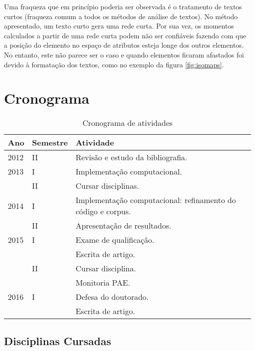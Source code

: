 \documentclass[a4paper,openright,12pt]{report} %
\begin{document}
Uma fraqueza que em princ\'ipio poderia ser observada \'e o tratamento de textos curtos (fraqueza comum a todos os m\'etodos de an\'alise de textos). No m\'etodo apresentado, um texto curto gera uma rede curta. Por sua vez, os momentos calculados a partir de uma rede curta podem n\~ao ser confi\'aveis fazendo com que a posi\c c\~ao do elemento no espa\c co de atributos esteja longe dos outros elementos. No entanto, este n\~ao parece ser o caso e quando elementos ficaram afastados foi devido \`a formata\c c\~ao dos textos, como no exemplo da figura \ref{fig:isomaps}.\\



\chapter{Cronograma}

\begin{center}
\begin{table}[ht]
\centering
\begin{tabular}{lll}
Ano & Semestre & Atividade \\
\hline
2012 & II & Revis\~ao e estudo da bibliografia.\\
\hline
2013 & I & Implementa\c c\~ao computacional.\\
\ & II & Cursar disciplinas.\\
\hline
2014 & I & Implementa\c c\~ao computacional: refinamento do c\'odigo e corpus.\\
\ & II & Apresenta\c c\~ao de resultados.\\
\hline
2015 & I & Exame de qualifica\c c\~ao.\\
\ & \ & Escrita de artigo.\\
\ & II & Cursar disciplina.\\
\ & \ & Monitoria PAE.\\
\hline
2016 & I & Defesa do doutorado.\\
\ & \ & Escrita de artigo.\\
\hline
\end{tabular}
\caption{Cronograma de atividades}
\label{table:cronograma}
\end{table}
\end{center}

\section{Disciplinas Cursadas}
\end{document}
